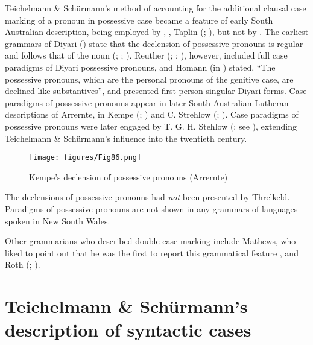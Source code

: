 Teichelmann \& Schürmann’s method of accounting for the additional clausal case marking of a pronoun in possessive case became a feature of early South Australian description, being employed by \citet[25]{meyer_vocabulary_1843}, \citet[14--18]{moorhouse_vocabulary_1846}, Taplin (\citeyear[no pag]{taplin_vocabulary_1867}; \citeyear[12]{taplin_grammar_1880}), but not by \citet{schurmann_letter_1844}. The earliest grammars of Diyari () state that the declension of possessive pronouns is regular and follows that of the noun (\citealt[no pag]{koch_untitled_1868}; \citealt[5]{schoknecht_grammar_1947}; \citealt[18--20]{flierl_christianieli_1880}). Reuther (\citeyear{reuther_dieri_1894}; \citeyear{reuther_ms_1899}; ), however, included full case paradigms of Diyari possessive pronouns, and Homann (in \citealt[44]{fraser_australian_1892}) stated, “The possessive pronouns, which are the personal pronouns of the genitive case, are declined like substantives”, and presented first-person singular Diyari forms. Case paradigms of possessive pronouns appear in later South Australian Lutheran descriptions of Arrernte, in Kempe (\citeyear[8]{kempe_galtjintana-pepa_1891}; ) and C. Strehlow (\citeyear[68--71]{strehlow_untitled_1931}; \citeyear[14--16]{strehlow_notitle_1910}). Case paradigms of possessive pronouns were later engaged by T. G. H. Stehlow (\citeyear[95--96]{strehlow_aranda_1944}; see \citealt{Stockigt2021a}), extending Teichelmann \& Schürmann’s influence into the twentieth century.

 
\begin{figure}
\texttt{[image: figures/Fig86.png]}
\caption{\label{fig:5:86}Kempe’s declension of possessive pronouns \citeyearpar[8]{kempe_grammar_1891} (Arrernte)}
\end{figure}


The declensions of possessive pronouns had \textit{not} been presented by Threlkeld. Paradigms of possessive pronouns are not shown in any grammars of languages spoken in New South Wales. 

\newpage
\hspace*{-1pt}Other grammarians who described double case marking include Mathews, who liked to point out that he was the first to report this grammatical feature \citep[181]{koch_r_2008}, and Roth (\citeyear[7]{roth_ethnological_1897}; ).

\section{Teichelmann \& Schürmann’s description of syntactic cases}
\label{sec:key:5.4}

